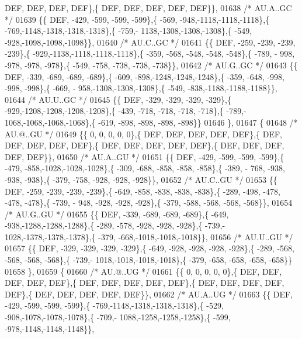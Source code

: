 \begin{DoxyCode}
      DEF,  DEF,  DEF,  DEF\},\{  DEF,  DEF,  DEF,  DEF,  DEF\}\},
01638 \textcolor{comment}{/* AU.A..GC */}
01639 \{\{  DEF, -429, -599, -599, -599\},\{ -569, -948,-1118,-1118,-1118\},\{ -769,-1148,-1318,-1318,-1318\},\{ -759,-
      1138,-1308,-1308,-1308\},\{ -549, -928,-1098,-1098,-1098\}\},
01640 \textcolor{comment}{/* AU.C..GC */}
01641 \{\{  DEF, -259, -239, -239, -239\},\{ -929,-1138,-1118,-1118,-1118\},\{ -359, -568, -548, -548, -548\},\{ -789, -
      998, -978, -978, -978\},\{ -549, -758, -738, -738, -738\}\},
01642 \textcolor{comment}{/* AU.G..GC */}
01643 \{\{  DEF, -339, -689, -689, -689\},\{ -609, -898,-1248,-1248,-1248\},\{ -359, -648, -998, -998, -998\},\{ -669, -
      958,-1308,-1308,-1308\},\{ -549, -838,-1188,-1188,-1188\}\},
01644 \textcolor{comment}{/* AU.U..GC */}
01645 \{\{  DEF, -329, -329, -329, -329\},\{ -929,-1208,-1208,-1208,-1208\},\{ -439, -718, -718, -718, -718\},\{ -789,-
      1068,-1068,-1068,-1068\},\{ -619, -898, -898, -898, -898\}\}
01646 \},
01647 \{
01648 \textcolor{comment}{/* AU.@..GU */}
01649 \{\{    0,    0,    0,    0,    0\},\{  DEF,  DEF,  DEF,  DEF,  DEF\},\{  DEF,  DEF,  DEF,  DEF,  DEF\},\{  DEF,  
      DEF,  DEF,  DEF,  DEF\},\{  DEF,  DEF,  DEF,  DEF,  DEF\}\},
01650 \textcolor{comment}{/* AU.A..GU */}
01651 \{\{  DEF, -429, -599, -599, -599\},\{ -479, -858,-1028,-1028,-1028\},\{ -309, -688, -858, -858, -858\},\{ -389, -
      768, -938, -938, -938\},\{ -379, -758, -928, -928, -928\}\},
01652 \textcolor{comment}{/* AU.C..GU */}
01653 \{\{  DEF, -259, -239, -239, -239\},\{ -649, -858, -838, -838, -838\},\{ -289, -498, -478, -478, -478\},\{ -739, -
      948, -928, -928, -928\},\{ -379, -588, -568, -568, -568\}\},
01654 \textcolor{comment}{/* AU.G..GU */}
01655 \{\{  DEF, -339, -689, -689, -689\},\{ -649, -938,-1288,-1288,-1288\},\{ -289, -578, -928, -928, -928\},\{ -739,-
      1028,-1378,-1378,-1378\},\{ -379, -668,-1018,-1018,-1018\}\},
01656 \textcolor{comment}{/* AU.U..GU */}
01657 \{\{  DEF, -329, -329, -329, -329\},\{ -649, -928, -928, -928, -928\},\{ -289, -568, -568, -568, -568\},\{ -739,-
      1018,-1018,-1018,-1018\},\{ -379, -658, -658, -658, -658\}\}
01658 \},
01659 \{
01660 \textcolor{comment}{/* AU.@..UG */}
01661 \{\{    0,    0,    0,    0,    0\},\{  DEF,  DEF,  DEF,  DEF,  DEF\},\{  DEF,  DEF,  DEF,  DEF,  DEF\},\{  DEF,  
      DEF,  DEF,  DEF,  DEF\},\{  DEF,  DEF,  DEF,  DEF,  DEF\}\},
01662 \textcolor{comment}{/* AU.A..UG */}
01663 \{\{  DEF, -429, -599, -599, -599\},\{ -769,-1148,-1318,-1318,-1318\},\{ -529, -908,-1078,-1078,-1078\},\{ -709,-
      1088,-1258,-1258,-1258\},\{ -599, -978,-1148,-1148,-1148\}\},

\end{DoxyCode}
